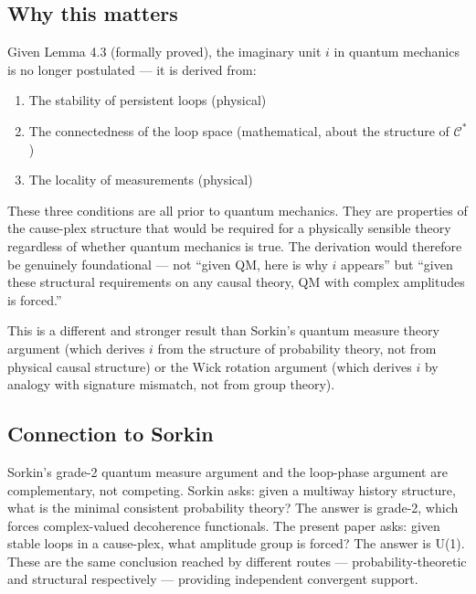 \documentclass[11pt]{article}
\providecommand{\tightlist}{\setlength{\itemsep}{0pt}\setlength{\parskip}{0pt}}
\theoremstyle{definition}
\theoremstyle{remark}
\begin{document}
\subsection{Why this matters}\label{why-this-matters}

Given Lemma 4.3 (formally proved), the imaginary unit \(i\) in quantum
mechanics is no longer postulated --- it is derived from:

\begin{enumerate}
\def\labelenumi{\arabic{enumi}.}
\tightlist
\item
  The stability of persistent loops (physical)
\item
  The connectedness of the loop space (mathematical, about the structure
  of \(\mathcal{C}^{\ast}\))
\item
  The locality of measurements (physical)
\end{enumerate}

These three conditions are all prior to quantum mechanics. They are
properties of the cause-plex structure that would be required for a
physically sensible theory regardless of whether quantum mechanics is
true. The derivation would therefore be genuinely foundational --- not
``given QM, here is why \(i\) appears'' but ``given these structural
requirements on any causal theory, QM with complex amplitudes is
forced.''

This is a different and stronger result than Sorkin's quantum measure
theory argument (which derives \(i\) from the structure of probability
theory, not from physical causal structure) or the Wick rotation
argument (which derives \(i\) by analogy with signature mismatch, not
from group theory).

\subsection{Connection to Sorkin}\label{connection-to-sorkin}

Sorkin's grade-2 quantum measure argument and the loop-phase argument
are complementary, not competing. Sorkin asks: given a multiway history
structure, what is the minimal consistent probability theory? The answer
is grade-2, which forces complex-valued decoherence functionals. The
present paper asks: given stable loops in a cause-plex, what amplitude
group is forced? The answer is U(1). These are the same conclusion
reached by different routes --- probability-theoretic and structural
respectively --- providing independent convergent support.
\end{document}
